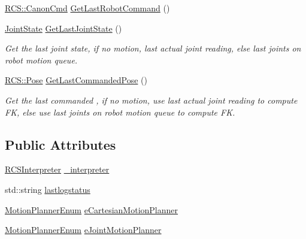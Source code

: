\begin{DoxyCompactItemize}
\item 
\hyperlink{structRCS_1_1CanonCmd}{R\-C\-S\-::\-Canon\-Cmd} \hyperlink{structRCS_1_1CController_af150048fb1660e68d9f5ec1043494ea9}{Get\-Last\-Robot\-Command} ()
\item 
\hyperlink{RCS_8h_aa4adb93a26caa4dacba9c9614e283245}{Joint\-State} \hyperlink{structRCS_1_1CController_a7334e3abcc69cc6e3a9f82e59c682551}{Get\-Last\-Joint\-State} ()
\begin{DoxyCompactList}\small\item\em Get the last joint state, if no motion, last actual joint reading, else last joints on robot motion queue. \end{DoxyCompactList}\item 
\hyperlink{namespaceRCS_aa07e45d8a50e30064283d2b38087f999}{R\-C\-S\-::\-Pose} \hyperlink{structRCS_1_1CController_ae7230e4ecd977fb1519b13b2ed696897}{Get\-Last\-Commanded\-Pose} ()
\begin{DoxyCompactList}\small\item\em Get the last commanded , if no motion, use last actual joint reading to compute F\-K, else use last joints on robot motion queue to compute F\-K. \end{DoxyCompactList}\end{DoxyCompactItemize}
\subsection*{Public Attributes}
\begin{DoxyCompactItemize}
\item 
\hyperlink{classRCSInterpreter}{R\-C\-S\-Interpreter} \hyperlink{structRCS_1_1CController_a4c3c287cebfd9fa9fb413205fa0b49f6}{\-\_\-interpreter}
\item 
std\-::string \hyperlink{structRCS_1_1CController_a8bd2705747d1e16f5806ddf183bfade7}{lastlogstatus}
\item 
\hyperlink{structRCS_1_1CController_a50ede7cd9f47204828f0f7c740dc09b1}{Motion\-Planner\-Enum} \hyperlink{structRCS_1_1CController_a4174fd5467045e780fe53bde42e70735}{e\-Cartesian\-Motion\-Planner}
\item 
\hyperlink{structRCS_1_1CController_a50ede7cd9f47204828f0f7c740dc09b1}{Motion\-Planner\-Enum} \hyperlink{structRCS_1_1CController_ad788d0def2101be74b680394bcbc78e7}{e\-Joint\-Motion\-Planner}
\end{DoxyCompactItemize}
